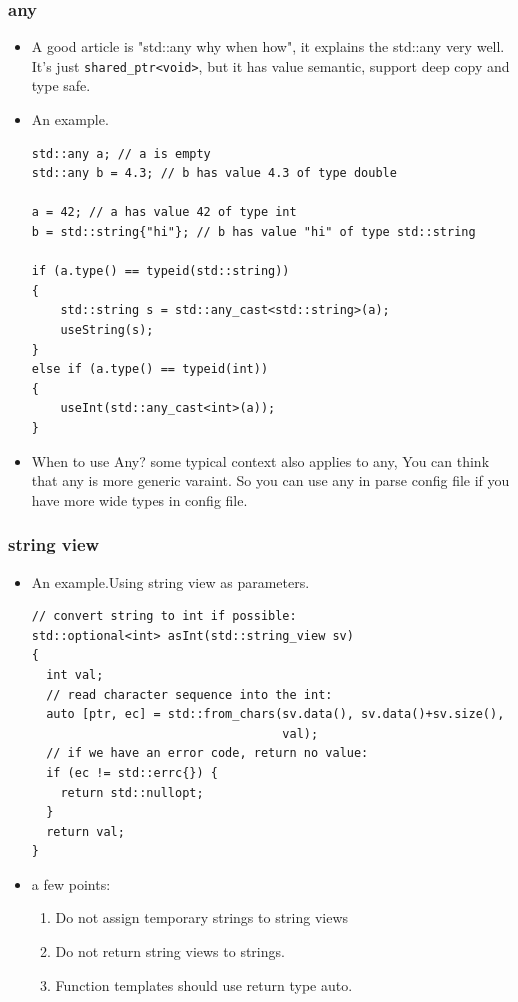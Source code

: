 \documentclass[a4paper,11pt,twoside]{book}
\begin{document}
\subsubsection{any}
\begin{itemize}
		\item A good article is "std::any why when how", it explains the std::any very well. It's just \newline 
		\texttt{shared\_ptr<void>}, but it has value semantic, support deep copy and type safe. 
		\item An example.
\begin{lstlisting}
std::any a; // a is empty
std::any b = 4.3; // b has value 4.3 of type double
 
a = 42; // a has value 42 of type int
b = std::string{"hi"}; // b has value "hi" of type std::string
 
if (a.type() == typeid(std::string)) 
{
    std::string s = std::any_cast<std::string>(a);
    useString(s);
}
else if (a.type() == typeid(int)) 
{
    useInt(std::any_cast<int>(a));
}
\end{lstlisting}

    \item When to use Any? some typical context also applies to any, You can think that any is more generic varaint. So you can use any in parse config file if you have more wide types in config file. 

\end{itemize}

\subsubsection{string view}
\begin{itemize}
\item An example.Using string view as parameters.
\begin{lstlisting}
// convert string to int if possible:
std::optional<int> asInt(std::string_view sv)
{
  int val;
  // read character sequence into the int:
  auto [ptr, ec] = std::from_chars(sv.data(), sv.data()+sv.size(),
                                   val);
  // if we have an error code, return no value:
  if (ec != std::errc{}) {
    return std::nullopt;
  }
  return val;
}
\end{lstlisting}
\item a few points:
\begin{enumerate}
		\item Do not assign temporary strings to string views
		\item Do not return string views to strings.
		\item Function templates should use return type auto. 
\end{enumerate}

\end{itemize}
\end{document}

